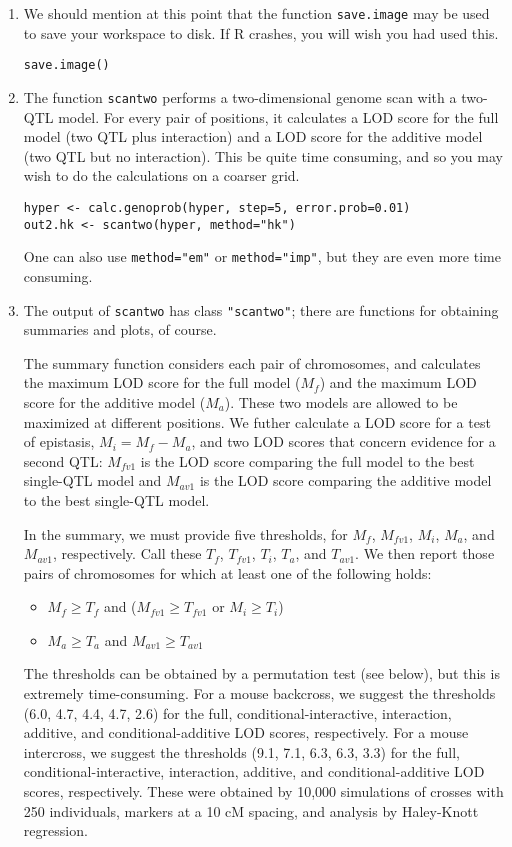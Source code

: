 \documentclass[10pt,letterpaper]{article}
\newcommand{\usercolor}{\color [named]{BlueViolet}}
\begin{document}
\begin{enumerate}
\item We should mention at this point that the function
\verb-save.image- may be used to save your workspace to disk.  If R
crashes, you will wish you had used this.  

\usercolor \verb|save.image()| \normalcolor

\item The function \verb-scantwo- performs a two-dimensional genome
scan with a two-QTL model.  For every pair of positions, it calculates
a LOD score for the full model (two QTL plus interaction) and a LOD
score for the additive model (two QTL but no interaction).  This be
quite time consuming, and so you may wish to do the calculations on a
coarser grid.

\usercolor
\verb|hyper <- calc.genoprob(hyper, step=5, error.prob=0.01)| 
\\
\verb|out2.hk <- scantwo(hyper, method="hk")| 
\normalcolor

One can also use \verb-method="em"- or \verb-method="imp"-, but they
are even more time consuming.

\item \label{scantwo} The output of \verb-scantwo- has class \verb-"scantwo"-; there
are functions for obtaining summaries and plots, of course.

The summary function considers each pair of chromosomes, and
calculates the maximum LOD score for the full model ($M_f$) and the maximum
LOD score for the additive model ($M_a$).  These two models are allowed
to be maximized at different positions.   We futher calculate a LOD
score for a test of epistasis, $M_i = M_f - M_a$, and two LOD scores
that concern evidence for a second QTL: $M_{fv1}$ is the LOD score
comparing the full model to the best single-QTL model and $M_{av1}$ is
the LOD score comparing the additive model to the best single-QTL
model.  

In the summary, we must provide five thresholds, for $M_f$, 
$M_{fv1}$, $M_i$, $M_a$, and $M_{av1}$, respectively.  Call these $T_f$,
$T_{fv1}$, $T_i$, $T_a$, and $T_{av1}$.  We then report those pairs of
chromosomes for which at least one of the following holds:
\begin{itemize}
\item $M_f \ge T_f$ and ($M_{fv1} \ge T_{fv1}$ or $M_i \ge T_i$)
\item $M_a \ge T_a$ and $M_{av1} \ge T_{av1}$
\end{itemize}

The thresholds can be obtained by a permutation test (see below), but
this is extremely time-consuming.  For a mouse backcross, we suggest
the thresholds (6.0, 4.7, 4.4, 4.7, 2.6) for the full,
conditional-interactive, interaction, additive, and
conditional-additive LOD scores, respectively.  For a mouse
intercross, we suggest the thresholds (9.1, 7.1, 6.3, 6.3, 3.3) for the
full, conditional-interactive, interaction, additive, and
conditional-additive LOD scores, respectively.  These were obtained by
10,000 simulations of crosses with 250 individuals, markers at a 10 cM
spacing, and analysis by Haley-Knott regression.


\end{enumerate}
\end{document}
